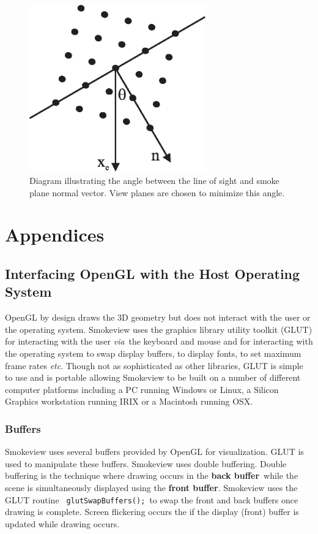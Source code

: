 \documentclass[11pt,twoside]{book}
\begin{document}
\begin{figure}
\centerline{\includegraphics[width=3.0in]{figures/figDIRB}}
\caption{Diagram illustrating the angle between the line of sight
and smoke plane normal vector.  View planes are chosen to minimize
this angle.} \label{figDIRB}
\end{figure}
%
%

\part{Appendices}
\appendix

%
%

\chapter{Interfacing OpenGL with the Host Operating System}
OpenGL by design draws
the 3D geometry but does not interact with the user or the
operating system. Smokeview uses the graphics library utility
toolkit (GLUT) for interacting with the user {\em via}\ the
keyboard and mouse and for interacting with the operating system
to swap display buffers, to display fonts, to set maximum frame
rates {\em etc}. Though not as sophisticated as other libraries,
GLUT is simple to use and is portable allowing Smokeview to be
built on a number of different computer platforms including a PC
running Windows or Linux, a Silicon Graphics workstation running
IRIX or a Macintosh running OSX.

\section{Buffers} Smokeview uses several buffers provided by
OpenGL for visualization.  GLUT is used to manipulate these
buffers. Smokeview uses double buffering.  Double buffering is the technique where drawing occurs in the
{\bf back buffer}\ while the scene is simultaneously displayed using
the {\bf front buffer}. Smokeview uses the GLUT routine {\tt
glutSwapBuffers();}\ to swap the front and back buffers once
drawing is complete. Screen flickering occurs the if the display (front) buffer is updated while drawing occurs.
\end{document}
